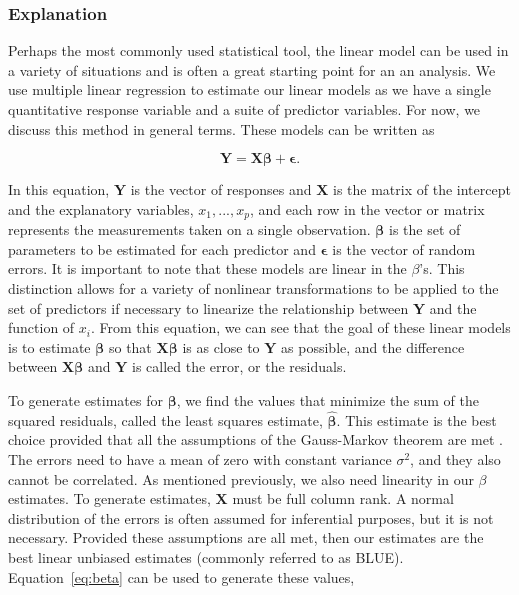 \documentclass[12pt]{article}\usepackage[]{graphicx}\usepackage[]{color}
\begin{document}
\subsubsection{Explanation}
Perhaps the most commonly used statistical tool, the linear model can be used in a variety of situations and is often a great starting point for an an analysis. We use multiple linear regression to estimate our linear models as we have a single quantitative response variable and a suite of predictor variables. For now, we discuss this method in general terms. These models can be written as

\begin{equation} \label{eq:lm}
\boldsymbol{Y}=\boldsymbol{X\beta}+\boldsymbol{\epsilon}.
\end{equation}

In this equation, $\boldsymbol{Y}$ is the vector of responses and $\boldsymbol{X}$ is the matrix of the intercept and the explanatory variables, $x_{1},...,x_{p}$, and each row in the vector or matrix represents the measurements taken on a single observation. $\boldsymbol{\beta}$ is the set of parameters to be estimated for each predictor and $\boldsymbol{\epsilon}$ is the vector of random errors. It is important to note that these models are linear in the $\beta$'s. This distinction allows for a variety of nonlinear transformations to be applied to the set of predictors if necessary to linearize the relationship between \textbf{Y} and the function of $x_{i}$. From this equation, we can see that the goal of these linear models is to estimate $\boldsymbol{\beta}$ so that $\boldsymbol{X\beta}$ is as close to $\boldsymbol{Y}$ as possible, and the difference between $\boldsymbol{X\beta}$ and $\boldsymbol{Y}$ is called the error, or the residuals. 

To generate estimates for $\boldsymbol{\beta}$, we find the values that minimize the sum of the squared residuals, called the least squares estimate, $\boldsymbol{\hat{\beta}}$. This estimate is the best choice provided that  all the assumptions of the Gauss-Markov theorem are met \cite{lm}. The errors need to have a mean of zero with constant variance $\sigma^{2}$, and they also cannot be correlated. As mentioned previously, we also need linearity in our $\beta$ estimates. To generate estimates, $\boldsymbol{X}$ must be full column rank. A normal distribution of the errors is often assumed for inferential purposes, but it is not necessary. Provided these assumptions are all met, then our estimates are the best linear unbiased estimates (commonly referred to as BLUE). Equation~\ref{eq:beta} can be used to generate these values,
\end{document}
